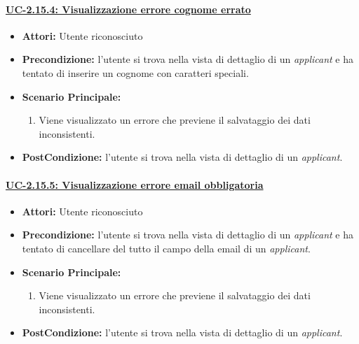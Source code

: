 \paragraph{\underline{UC-2.15.4: Visualizzazione errore cognome errato}}
\begin{itemize}	
	\item \textbf{Attori:} Utente riconosciuto
	\item \textbf{Precondizione:}  l'utente si trova nella vista di dettaglio di un \textit{applicant} e ha tentato di inserire un cognome con caratteri speciali.
	\item \textbf{Scenario Principale:}
	\begin{enumerate}
		\item Viene visualizzato un errore che previene il salvataggio dei dati inconsistenti.
	\end{enumerate}
	\item \textbf{PostCondizione:} l'utente si trova nella vista di dettaglio di un \textit{applicant}.
\end{itemize}

\paragraph{\underline{UC-2.15.5: Visualizzazione errore email obbligatoria}}
\begin{itemize}	
	\item \textbf{Attori:} Utente riconosciuto
	\item \textbf{Precondizione:}  l'utente si trova nella vista di dettaglio di un \textit{applicant} e ha tentato di cancellare del tutto il campo della email di un \textit{applicant}.
	\item \textbf{Scenario Principale:}
	\begin{enumerate}
		\item Viene visualizzato un errore che previene il salvataggio dei dati inconsistenti.
	\end{enumerate}
	\item \textbf{PostCondizione:} l'utente si trova nella vista di dettaglio di un \textit{applicant}.
\end{itemize}

